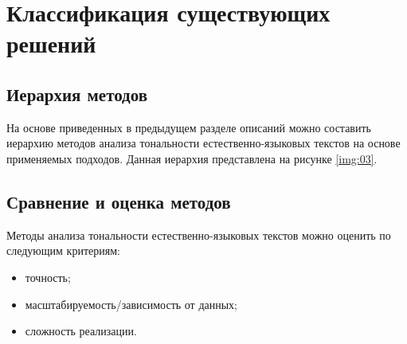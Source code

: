 \chapter{Классификация существующих решений}

\section{Иерархия методов}

На основе приведенных в предыдущем разделе описаний можно составить иерархию
методов анализа тональности естественно-языковых текстов на основе применяемых
подходов. Данная иерархия представлена на рисунке \ref{img:03}.


\section{Сравнение и оценка методов}

Методы анализа тональности естественно-языковых текстов можно оценить по
следующим критериям:
\begin{itemize}
    \item точность;
    \item масштабируемость/зависимость от данных;
    \item сложность реализации.
\end{itemize}
~\\
~\\

